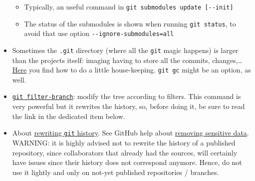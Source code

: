 \documentclass[a4paper,12pt,%
              final%
              ]{article}
\begin{document}
\begin{itemize}
    \begin{itemize}
      \item Typically, an useful command in \verb|git submodules update [--init]|
      \item The status of the submodules is shown when running \verb|git status|, to avoid that use option \verb|--ignore-submodules=all|
    \end{itemize}
  \item Sometimes the \texttt{.git} directory (where all the \texttt{git} magic happens) is larger than the projects itself: imaging having to store all the commits, changes,\ldots{} \href{https://stackoverflow.com/questions/5277467/how-can-i-clean-my-git-folder-cleaned-up-my-project-directory-but-git-is-sti}{Here} you find how to do a little house-keeping. \verb|git gc| might be an option, as well.
  \item \href{https://git-scm.com/docs/git-filter-branch}{\texttt{git filter-branch}}: modify the tree according to filters. This command is very powerful but it rewrites the history, so, before doing it, be sure to read the link in the dedicated item below.
  \item About \href{https://git-scm.com/book/en/v2/Git-Tools-Rewriting-History}{rewriting \texttt{git} history}. See GitHub help about \href{https://docs.github.com/en/authentication/keeping-your-account-and-data-secure/removing-sensitive-data-from-a-repository}{removing sensitive data}. WARNING: it is highly advised not to rewrite the history of a published repository, since collaborators that already had the sources, will certainly have issues since their history does not correspond anymore. Hence, do not use it lightly and only on not-yet published repositories / branches.

\end{itemize}
\end{document}
